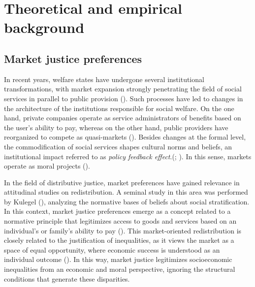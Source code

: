 \documentclass[
  12pt,
]{article}
\begin{document}
\section{Theoretical and empirical
background}\label{theoretical-and-empirical-background}

\subsection{Market justice
preferences}\label{market-justice-preferences}

In recent years, welfare states have undergone several institutional
transformations, with market expansion strongly penetrating the field of
social services in parallel to public provision
().
Such processes have led to changes in the architecture of the
institutions responsible for social welfare. On the one hand, private
companies operate as service administrators of benefits based on the
user's ability to pay, whereas on the other hand, public providers have
reorganized to compete as quasi-markets
(). Besides changes at the
formal level, the commodification of social services shapes cultural
norms and beliefs, an institutional impact referred to as \emph{policy
feedback effect}.(;
). In
this sense, markets operate as moral projects
().

In the field of distributive justice, market preferences have gained
relevance in attitudinal studies on redistribution. A seminal study in
this area was performed by Kulegel
(), analyzing the normative
bases of beliefs about social stratification. In this context, market
justice preferences emerge as a concept related to a normative principle
that legitimizes access to goods and services based on an individual's
or family's ability to pay (). This market-oriented redistribution is closely related to the
justification of inequalities, as it views the market as a space of
equal opportunity, where economic success is understood as an individual
outcome (). In this way, market justice legitimizes socioeconomic
inequalities from an economic and moral perspective, ignoring the
structural conditions that generate these disparities.
\end{document}
